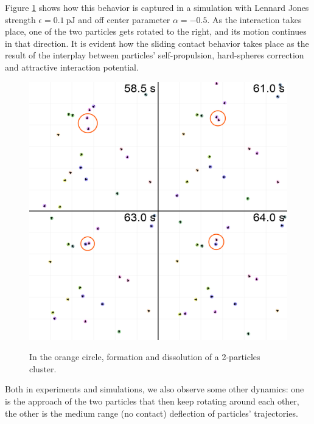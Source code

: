 \documentclass[../../master_thesis_np.tex]{subfiles}
\begin{document}
	Figure \ref{fig:simdoub} shows how this behavior is captured in a simulation with Lennard Jones strength $\epsilon = \SI{0.1}{\pico\joule}$ and off center parameter $\alpha = -0.5$.
	As the interaction takes place, one of the two particles gets rotated to the right, and its motion continues in that direction.
	It is evident how the sliding contact behavior takes place as the result of the interplay between particles' self-propulsion, hard-spheres correction and attractive interaction potential.
	\begin{figure}[hbtp]
		\centering
		\includegraphics[width = \textwidth]{qual/simdoub.png}
		\label{fig:simdoub}
		\caption{In the orange circle, formation and dissolution of a 2-particles cluster.}
	\end{figure}
	
	Both in experiments and simulations, we also observe some other dynamics: one is the approach of the two particles that then keep rotating around each other, the other is the medium range (no contact) deflection of particles' trajectories.
	
\end{document}
